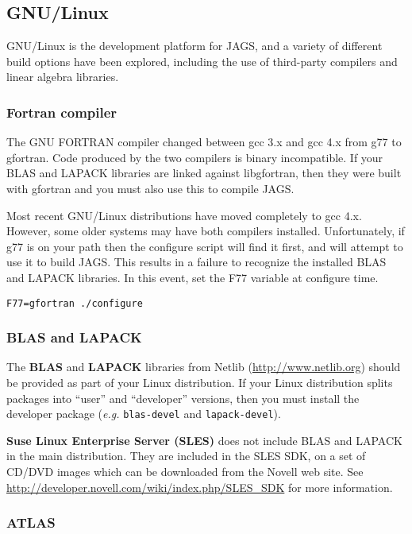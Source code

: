 \documentclass[11pt, a4paper, titlepage]{article}
\newcommand{\JAGS}{\textsf{JAGS}}
\newcommand{\code}[1]{{\bgroup{\normalfont\ttfamily #1}\egroup}}
\begin{document}
\subsection{GNU/Linux}
\label{section:gnulinux}

GNU/Linux is the development platform for \JAGS, and a variety of
different build options have been explored, including the use of
third-party compilers and linear algebra libraries.

\subsubsection{Fortran compiler}

The GNU FORTRAN compiler changed between gcc 3.x and gcc 4.x from
\code{g77} to \code{gfortran}. Code produced by the two compilers is
binary incompatible. If your BLAS and LAPACK libraries are linked
against \code{libgfortran}, then they were built with \code{gfortran}
and you must also use this to compile \JAGS. 

Most recent GNU/Linux distributions have moved completely to gcc 4.x.
However, some older systems may have both compilers installed.
Unfortunately, if \code{g77} is on your path then the configure script
will find it first, and will attempt to use it to build \JAGS. This
results in a failure to recognize the installed BLAS and LAPACK
libraries. In this event, set the \code{F77} variable at configure time.
\begin{verbatim}
F77=gfortran ./configure
\end{verbatim}

\subsubsection{BLAS and LAPACK}

The {\bf BLAS} and {\bf LAPACK} libraries from Netlib
(\url{http://www.netlib.org}) should be provided as part of your Linux
distribution. If your Linux distribution splits packages into ``user''
and ``developer'' versions, then you must install the developer
package ({\em e.g.}  \texttt{blas-devel} and \texttt{lapack-devel}).

{\bf Suse Linux Enterprise Server (SLES)} does not include BLAS and
LAPACK in the main distribution. They are included in the SLES SDK, on
a set of CD/DVD images which can be downloaded from the Novell web
site.  See \url{http://developer.novell.com/wiki/index.php/SLES_SDK}
for more information.

\subsubsection{ATLAS}
\end{document}

